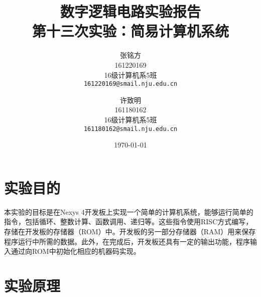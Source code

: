 \documentclass[titlepage, 11pt]{article}
\begin{document}
	\title{\vspace{-15mm}数字逻辑电路实验报告\\\vspace{15mm}\Huge\textbf{第十三次实验：简易计算机系统}\vspace{50mm}}
	\author{张铭方\\161220169\\16级计算机系5班\\\texttt{161220169@smail.nju.edu.cn}\and 许致明\\161180162\\16级计算机系5班\\\texttt{161180162@smail.nju.edu.cn}}\date{\vspace{70mm}\today}
	\maketitle
	\section{实验目的}
	本实验的目标是在Nexys 4开发板上实现一个简单的计算机系统，能够运行简单的指令，包括循环、整数计算、函数调用、递归等。这些指令使用RISC方式编写，存储在开发板的存储器（ROM）中。开发板的另一部分存储器（RAM）用来保存程序运行中所需的数据。此外，在完成后，开发板还具有一定的输出功能，程序输入通过向ROM中初始化相应的机器码实现。
	\section{实验原理}
\end{document}
